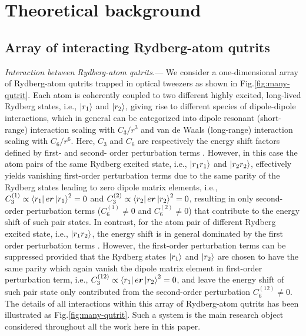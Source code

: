 \documentclass[%
 reprint,
nofootinbib,
 amsmath,amssymb,
 aps,
floatfix,
]{revtex4-2}
\begin{document}
\section{Theoretical background}

\subsection{Array of interacting Rydberg-atom qutrits}

\emph{Interaction between Rydberg-atom qutrits.}--- We consider a one-dimensional array of Rydberg-atom qutrits trapped in optical tweezers as shown in Fig.\ref{fig:many-qutrit}. Each atom is coherently coupled to two different highly excited, long-lived Rydberg states, i.e., $\ket{r_1}$ and $\ket{r_2}$, giving rise to different species of dipole-dipole interactions, which in general can be categorized into dipole resonant (short-range) interaction scaling with $C_3/r^3$ and van de Waals (long-range) interaction scaling with $C_6/r^6$. Here, $C_3$ and $C_6$ are respectively the energy shift factors defined by first- and second- order perturbation terms \cite{Saffman2010QuantumAtoms}. However, in this case the atom pairs of the same Rydberg excited state, i.e., $\ket{r_1r_1}$ and $\ket{r_2r_2}$, effectively yields vanishing first-order perturbation terms due to the same parity of the Rydberg states leading to zero dipole matrix elements, i.e., $C^{(1)}_3 \propto \bra{r_1}e\boldsymbol{r}\ket{r_1}^2 = 0$ and $C^{(2)}_3 \propto \bra{r_2}e\boldsymbol{r}\ket{r_2}^2 = 0$, resulting in only second-order perturbation terms ($C^{(1)}_6 \neq 0$ and $C^{(2)}_6 \neq 0$) that contribute to the energy shift of such pair states. In contrast, for the atom pair of different Rydberg excited state, i.e., $\ket{r_1r_2}$, the energy shift is in general dominated by the first order perturbation terms \cite{Saffman2010QuantumAtoms,Browaeys2020Many-bodyAtoms}. However, the first-order perturbation terms can be suppressed provided that the Rydberg states $\ket{r_1}$ and $\ket{r_2}$ are chosen to have the same parity which again vanish the dipole matrix element in first-order perturbation term, i.e., $C^{(12)}_3 \propto \bra{r_1}e\boldsymbol{r}\ket{r_2}^2 = 0$, and leave the energy shift of such pair state only contributed from the second-order perturbation $C^{(12)}_6 \neq 0$. The details of all interactions within this array of Rydberg-atom qutrits has been illustrated as Fig.\ref{fig:many-qutrit}. Such a system is the main research object considered throughout all the work here in this paper. 
\end{document}
